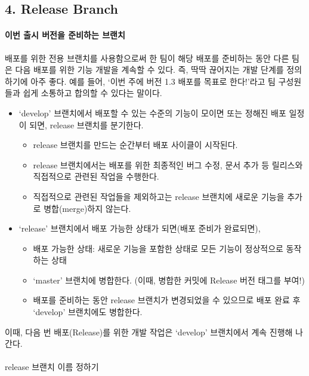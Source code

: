 \documentclass[12pt, a4paper, oneside]{book}
\begin{document}
	\subsection{4. Release Branch}

			\paragraph{이번 출시 버전을 준비하는 브랜치}
			배포를 위한 전용 브랜치를 사용함으로써 한 팀이 해당 배포를 준비하는 동안 다른 팀은 다음 배포를 위한 기능 개발을 계속할 수 있다. 
			즉, 딱딱 끊어지는 개발 단계를 정의하기에 아주 좋다.
			예를 들어, ‘이번 주에 버전 1.3 배포를 목표로 한다!’라고 팀 구성원들과 쉽게 소통하고 합의할 수 있다는 말이다.
			
		\begin{itemize}
\item		‘develop’ 브랜치에서 배포할 수 있는 수준의 기능이 모이면 또는 정해진 배포 일정이 되면, release 브랜치를 분기한다.
			\begin{itemize}
			\item		release 브랜치를 만드는 순간부터 배포 사이클이 시작된다.
			\item		release 브랜치에서는 배포를 위한 최종적인 버그 수정, 문서 추가 등 릴리스와 직접적으로 관련된 작업을 수행한다.
			\item		직접적으로 관련된 작업들을 제외하고는 release 브랜치에 새로운 기능을 추가로 병합(merge)하지 않는다.
			\end{itemize}
\item		‘release’ 브랜치에서 배포 가능한 상태가 되면(배포 준비가 완료되면),
			\begin{itemize}
			\item		배포 가능한 상태: 새로운 기능을 포함한 상태로 모든 기능이 정상적으로 동작 하는 상태
			\item		‘master’ 브랜치에 병합한다. (이때, 병합한 커밋에 Release 버전 태그를 부여!)
			\item		배포를 준비하는 동안 release 브랜치가 변경되었을 수 있으므로 배포 완료 후 ‘develop’ 브랜치에도 병합한다.
			\end{itemize}
			\end{itemize}


			이때, 다음 번 배포(Release)를 위한 개발 작업은 ‘develop’ 브랜치에서 계속 진행해 나간다.
			
			\paragraph{}release 브랜치 이름 정하기
\end{document}
